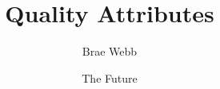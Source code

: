 \documentclass{csse4400}
\title{Quality Attributes}
\author{Brae Webb}
\date{{\color{red} The Future}}
\begin{document}
\makecover





\end{document}
